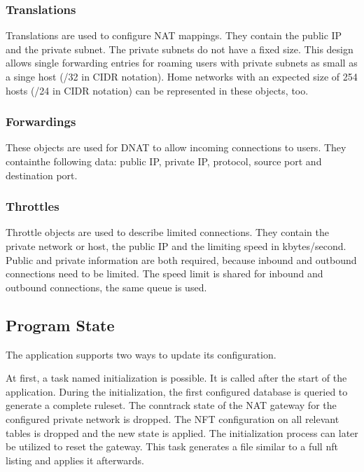 \subsubsection{Translations}\label{translations}

Translations are used to configure NAT mappings. They contain the public
IP and the private subnet. The private subnets do not have a fixed size.
This design allows single forwarding entries for roaming users with
private subnets as small as a singe host (/32 in CIDR notation). Home
networks with an expected size of 254 hosts (/24 in CIDR notation) can
be represented in these objects, too.

\subsubsection{Forwardings}\label{forwardings}

These objects are used for DNAT to allow incoming connections to users.
They containthe following data: public IP, private IP, protocol, source
port and destination port.

\subsubsection{Throttles}\label{throttles}

Throttle objects are used to describe limited connections. They contain
the private network or host, the public IP and the limiting speed in
kbytes/second. Public and private information are both required, because
inbound and outbound connections need to be limited. The speed limit is
shared for inbound and outbound connections, the same queue is used.

\subsection{Program State}\label{program-state}

The application supports two ways to update its configuration.

At first, a task named initialization is possible. It is called after
the start of the application. During the initialization, the first
configured database is queried to generate a complete ruleset. The
conntrack state of the NAT gateway for the configured private network is
dropped. The NFT configuration on all relevant tables is dropped and the
new state is applied. The initialization process can later be utilized
to reset the gateway. This task generates a file similar to a full nft
listing and applies it afterwards.

